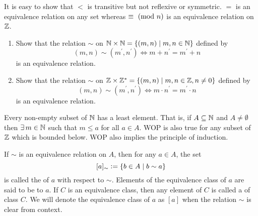 It is easy to show that $<$ is transitive but not reflexive or symmetric. $=$ is an equivalence relation on any set whereas $\equiv \ (\mathrm{mod}\ n)$ is an equivalence relation on $\mathbb{Z}$.

\begin{exe} \label{exe:equivalence-Z-Q}
\phantom{hi}
\begin{enumerate}
    \item Show that the relation $\sim$ on $\mathbb{N} \times \mathbb{N} = \left\{ (m,n) \mid m,n \in \mathbb{N} \right\}$ defined by
    \[
        (m,n) \sim (m^{\prime}, n^{\prime}) \iff m + n^{\prime} = m^{\prime} + n
    \]
    is an equivalence relation.
    
    \item Show that the relation $\sim$ on $\mathbb{Z} \times \mathbb{Z}^{\ast} = \left\{ (m,n) \mid m,n \in \mathbb{Z}, n \neq 0 \right\}$ defined by
    \[
        (m,n) \sim (m^{\prime}, n^{\prime}) \iff m \cdot n^{\prime} = m^{\prime} \cdot n
    \]
    is an equivalence relation.
\end{enumerate}
\end{exe}


\begin{rem} \label{rem:wop}
     Every non-empty subset of $\mathbb{N}$ has a least element. That is, if $A \subseteq \mathbb{N}$ and $A \neq \emptyset$ then $\exists \, m \in \mathbb{N}$ such that $m \leq a$ for all $a \in A$. WOP is also true for any subset of $\mathbb{Z}$ which is bounded below. WOP also implies the principle of induction.
\end{rem}

\begin{defn}
    If $\sim$ is an equivalence relation on $A$, then for any $a \in A$, the set
    \[
        [a]_{\sim} \vcentcolon= \{ b \in A \mid b \sim a \}
    \]
    is called the  of $a$ with respect to $\sim$. Elements of the equivalence class of $a$ are said to be  to $a$. If $C$ is an equivalence class, then any element of $C$ is called a  of class $C$. We will denote the equivalence class of $a$ as $[a]$ when the relation $\sim$ is clear from context.
\end{defn}




